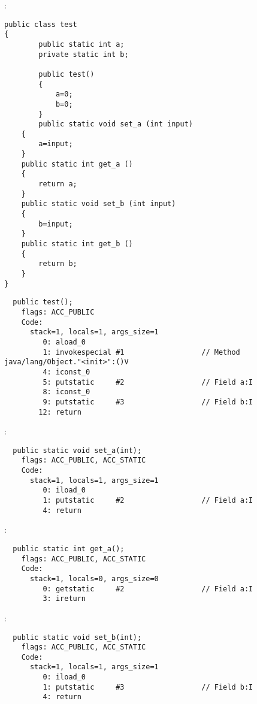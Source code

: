 
:

\begin{lstlisting}[caption=test.java]
public class test
{
        public static int a;
        private static int b;

        public test()
        {
            a=0;
            b=0;
        }
        public static void set_a (int input)
	{
		a=input;
	}
	public static int get_a ()
	{
		return a;
	}
	public static void set_b (int input)
	{
		b=input;
	}
	public static int get_b ()
	{
		return b;
	}
}
\end{lstlisting}


\begin{lstlisting}
  public test();
    flags: ACC_PUBLIC
    Code:
      stack=1, locals=1, args_size=1
         0: aload_0       
         1: invokespecial #1                  // Method java/lang/Object."<init>":()V
         4: iconst_0      
         5: putstatic     #2                  // Field a:I
         8: iconst_0      
         9: putstatic     #3                  // Field b:I
        12: return        
\end{lstlisting}
        
 :

\begin{lstlisting}
  public static void set_a(int);
    flags: ACC_PUBLIC, ACC_STATIC
    Code:
      stack=1, locals=1, args_size=1
         0: iload_0       
         1: putstatic     #2                  // Field a:I
         4: return        
\end{lstlisting}

 :

\begin{lstlisting}
  public static int get_a();
    flags: ACC_PUBLIC, ACC_STATIC
    Code:
      stack=1, locals=0, args_size=0
         0: getstatic     #2                  // Field a:I
         3: ireturn       
\end{lstlisting}

 :

\begin{lstlisting}
  public static void set_b(int);
    flags: ACC_PUBLIC, ACC_STATIC
    Code:
      stack=1, locals=1, args_size=1
         0: iload_0       
         1: putstatic     #3                  // Field b:I
         4: return        
\end{lstlisting}

